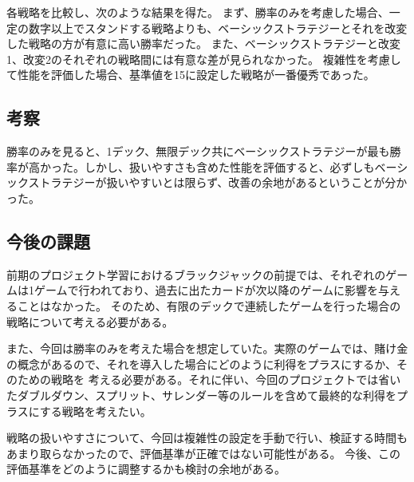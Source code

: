 各戦略を比較し、次のような結果を得た。
まず、勝率のみを考慮した場合、一定の数字以上でスタンドする戦略よりも、ベーシックストラテジーとそれを改変した戦略の方が有意に高い勝率だった。
また、ベーシックストラテジーと改変1、改変2のそれぞれの戦略間には有意な差が見られなかった。
複雑性を考慮して性能を評価した場合、基準値を15に設定した戦略が一番優秀であった。

\subsection{考察}

勝率のみを見ると、1デック、無限デック共にベーシックストラテジーが最も勝率が高かった。しかし、扱いやすさも含めた性能を評価すると、必ずしもベーシックストラテジーが扱いやすいとは限らず、改善の余地があるということが分かった。

\subsection{今後の課題}

前期のプロジェクト学習におけるブラックジャックの前提では、それぞれのゲームは1ゲームで行われており、過去に出たカードが次以降のゲームに影響を与えることはなかった。
そのため、有限のデックで連続したゲームを行った場合の戦略について考える必要がある。

また、今回は勝率のみを考えた場合を想定していた。実際のゲームでは、賭け金の概念があるので、それを導入した場合にどのように利得をプラスにするか、そのための戦略を
考える必要がある。それに伴い、今回のプロジェクトでは省いたダブルダウン、スプリット、サレンダー等のルールを含めて最終的な利得をプラスにする戦略を考えたい。

戦略の扱いやすさについて、今回は複雑性の設定を手動で行い、検証する時間もあまり取らなかったので、評価基準が正確ではない可能性がある。
今後、この評価基準をどのように調整するかも検討の余地がある。

